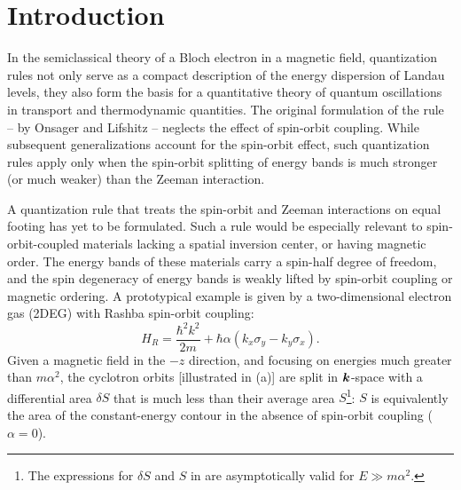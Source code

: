 \documentclass[aps, showpacs, twocolumn, notitlepage, superscriptaddress]{revtex4-1}
\begin{document}
\maketitle

\section{Introduction}
In the semiclassical theory of a Bloch electron in a magnetic field,  quantization rules not  only serve as a compact description of the  energy dispersion of Landau levels, they also form the basis for a quantitative theory of quantum oscillations in transport\cite{SdH} and thermodynamic\cite{dHvA} quantities.  The original formulation of the rule -- by Onsager\cite{Onsager} and Lifshitz\cite{lifshitz_kosevich,lifshitz_kosevich_jetp} -- neglects the effect of spin-orbit coupling. While subsequent generalizations \cite{rotheffham, rothmag, mikitik_manifestation_1999, topoferm, 100p, gao_zero-field_2017, fuchs_landau_2018} account for the spin-orbit effect, such quantization rules apply only when the spin-orbit splitting of energy bands is much stronger (or much weaker) than the Zeeman interaction.

A quantization rule that treats the spin-orbit and Zeeman interactions on equal footing has yet to be formulated. Such a rule would be especially relevant to spin-orbit-coupled materials lacking a spatial inversion center, or having magnetic order. The energy bands of these materials carry a spin-half degree of freedom, and the spin degeneracy of energy bands is weakly lifted by spin-orbit coupling or magnetic ordering. A prototypical example is given by  a two-dimensional electron gas (2DEG) with Rashba spin-orbit coupling:
\begin{equation}
H_R=\frac{{\hbar^2} k^2}{2m}+\hbar\alpha  (k_{x}\sigma_{y}-k_{y}\sigma_{x}).\label{eq:Rashba-Hamiltonian}
\end{equation}
Given a magnetic field in the $-z$ direction, and focusing on energies much greater than $m\alpha^2$, the cyclotron orbits [illustrated in (a)]   are split in $\boldsymbol{k}$-space with a differential area  $\delta S$ that is much less than their average area $S$\footnote{The expressions for $\delta S$ and $S$ in  are asymptotically valid for $E{\gg}m\alpha^2$.}:
$S$ is equivalently the area of the constant-energy contour in the absence of spin-orbit coupling ($\alpha{=}0$).
\end{document}
